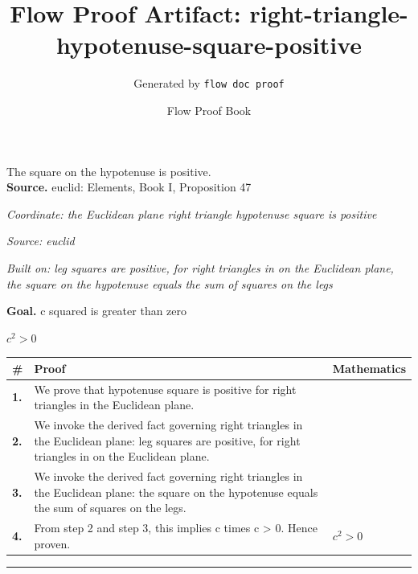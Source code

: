 \documentclass[11pt]{article}
\title{Flow Proof Artifact: right-triangle-hypotenuse-square-positive}
\author{Generated by \texttt{flow doc proof}}
\date{Flow Proof Book}
\theoremstyle{definition}
\begin{document}
\maketitle
The square on the hypotenuse is positive.\\[0.5em]
\textbf{Source.} euclid: Elements, Book I, Proposition 47\\[0.5em]
\bigskip
{}\par
\smallskip\noindent\textit{Coordinate: the Euclidean plane \cdot right triangle \cdot hypotenuse square is positive}\par
\smallskip\noindent\textit{Source: euclid}\par
\smallskip\noindent\textit{Built on: leg squares are positive, for right triangles in on the Euclidean plane, the square on the hypotenuse equals the sum of squares on the legs}\par
\medskip
\noindent\textbf{Goal.} c squared is greater than zero\par
\noindent$\displaystyle c^{2} > 0$\par
\medskip
\noindent
\begin{tabular}{@{} >{\raggedright\arraybackslash}p{} >{\raggedright\arraybackslash}p{} >{\raggedleft\arraybackslash}p{} @{}}
\textbf{\#} & \textbf{Proof} & \textbf{Mathematics} \\
\midrule
\textbf{1.} & We prove that hypotenuse square is positive for right triangles in the Euclidean plane. & \\[0.45em]
\textbf{2.} & We invoke the derived fact governing right triangles in the Euclidean plane: leg squares are positive, for right triangles in on the Euclidean plane. & \\[0.45em]
\textbf{3.} & We invoke the derived fact governing right triangles in the Euclidean plane: the square on the hypotenuse equals the sum of squares on the legs. & \\[0.45em]
\textbf{4.} & From step 2 and step 3, this implies c times c > 0. Hence proven. & $\displaystyle c^{2} > 0$ \\[0.45em]
\bottomrule
\end{tabular}
\label{thm:Geometry-right triangle-hypotenuse_square_is_positive}
\par\medskip\hrule
\end{document}
